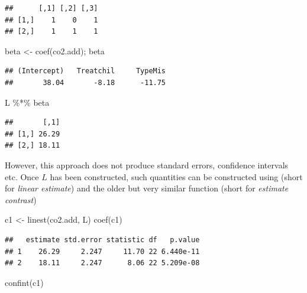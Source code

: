 \documentclass[
]{article}
\newenvironment{Shaded}{\begin{snugshade}}{\end{snugshade}}
\newcommand{\FunctionTok}[1]{\textcolor[rgb]{0.00,0.00,0.00}{#1}}
\newcommand{\NormalTok}[1]{#1}
\newcommand{\OtherTok}[1]{\textcolor[rgb]{0.56,0.35,0.01}{#1}}
\newcommand{\SpecialCharTok}[1]{\textcolor[rgb]{0.00,0.00,0.00}{#1}}
\begin{document}
\begin{verbatim}
##      [,1] [,2] [,3]
## [1,]    1    0    1
## [2,]    1    1    1
\end{verbatim}

\begin{Shaded}
\begin{Highlighting}[]
\NormalTok{beta }\OtherTok{\textless{}{-}} \FunctionTok{coef}\NormalTok{(co2.add); beta}
\end{Highlighting}
\end{Shaded}

\begin{verbatim}
## (Intercept)   Treatchil     TypeMis 
##       38.04       -8.18      -11.75
\end{verbatim}

\begin{Shaded}
\begin{Highlighting}[]
\NormalTok{L }\SpecialCharTok{\%*\%}\NormalTok{ beta}
\end{Highlighting}
\end{Shaded}

\begin{verbatim}
##       [,1]
## [1,] 26.29
## [2,] 18.11
\end{verbatim}

However, this approach does not produce standard errors, confidence
intervals etc. Once \(L\) has been constructed, such quantities can be
constructed using  (short for \emph{linear estimate}) and
the older but very similar  function (short for
\emph{estimate contrast})

\begin{Shaded}
\begin{Highlighting}[]
\NormalTok{c1 }\OtherTok{\textless{}{-}} \FunctionTok{linest}\NormalTok{(co2.add, L)}
\FunctionTok{coef}\NormalTok{(c1)}
\end{Highlighting}
\end{Shaded}

\begin{verbatim}
##   estimate std.error statistic df   p.value
## 1    26.29     2.247     11.70 22 6.440e-11
## 2    18.11     2.247      8.06 22 5.209e-08
\end{verbatim}

\begin{Shaded}
\begin{Highlighting}[]
\FunctionTok{confint}\NormalTok{(c1)}
\end{Highlighting}
\end{Shaded}
\end{document}
